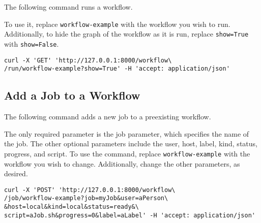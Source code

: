 The following command runs a workflow.

To use it, replace \texttt{workflow-example} with the workflow you wish
to run. Additionally, to hide the graph of the workflow as it is run,
replace \texttt{show=True} with \texttt{show=False}.

\begin{verbatim}
curl -X 'GET' 'http://127.0.0.1:8000/workflow\
/run/workflow-example?show=True' -H 'accept: application/json'
\end{verbatim}

\subsection{Add a Job to a Workflow}\label{add-a-job-to-a-workflow}

The following command adds a new job to a preexisting workflow.

The only required parameter is the job parameter, which specifies the
name of the job. The other optional parameters include the user, host,
label, kind, status, progress, and script. To use the command, replace
\texttt{workflow-example} with the workflow you wish to change.
Additionally, change the other parameters, as desired.

\begin{verbatim}
curl -X 'POST' 'http://127.0.0.1:8000/workflow\
/job/workflow-example?job=myJob&user=aPerson\
&host=local&kind=local&status=ready&\
script=aJob.sh&progress=0&label=aLabel' -H 'accept: application/json'
\end{verbatim}
